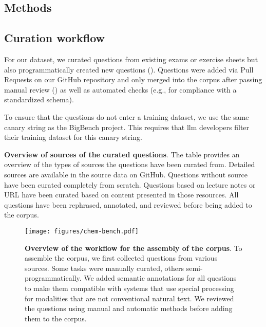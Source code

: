 \documentclass[11pt, oneside]{article}
\begin{document}
\begin{refsection}
\clearpage

\section{Methods}

\subsection{Curation workflow}\label{sec:curation}
For our dataset, we curated questions from existing exams or exercise sheets but also programmatically created new questions ().
Questions were added via Pull Requests on our GitHub repository and only merged into the corpus after passing manual review () as well as automated checks (e.g., for compliance with a standardized schema).

To ensure that the questions do not enter a training dataset, we use the same canary string as the BigBench project.
This requires that \Gls{llm} developers filter their training dataset for this canary string.\autocite{openai2024gpt4, srivastava2022beyond}



\begin{table}[!h]
    \centering
    \caption{\textbf{Overview of sources of the curated questions}. The table provides an overview of the types of sources the questions have been curated from. Detailed sources are available in the source data on GitHub. Questions without source have been curated completely from scratch. Questions based on lecture notes or URL have been curated based on content presented in those resources. All questions have been rephrased, annotated, and reviewed before being added to the corpus. }
    \label{tab:sources}
\end{table}

\begin{figure}[!h]
    \texttt{[image: figures/chem-bench.pdf]}
    \caption{\textbf{Overview of the workflow for the assembly of the \chembench corpus}.
    To assemble the \chembench corpus, we first collected questions from various sources. Some tasks were manually curated, others semi-programmatically. We added semantic annotations for all questions to make them compatible with systems that use special processing for modalities that are not conventional natural text. We reviewed the questions using manual and automatic methods before adding them to the corpus.}
    \label{fig:curation_workflow}
\end{figure}


\end{refsection}
\end{document}

